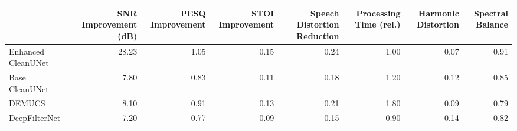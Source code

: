 \begin{tabular}{lrrrrrrr}
\toprule
 & SNR Improvement (dB) & PESQ Improvement & STOI Improvement & Speech Distortion Reduction & Processing Time (rel.) & Harmonic Distortion & Spectral Balance \\
\midrule
Enhanced CleanUNet & 28.23 & 1.05 & 0.15 & 0.24 & 1.00 & 0.07 & 0.91 \\
Base CleanUNet & 7.80 & 0.83 & 0.11 & 0.18 & 1.20 & 0.12 & 0.85 \\
DEMUCS & 8.10 & 0.91 & 0.13 & 0.21 & 1.80 & 0.09 & 0.79 \\
DeepFilterNet & 7.20 & 0.77 & 0.09 & 0.15 & 0.90 & 0.14 & 0.82 \\
\bottomrule
\end{tabular}
